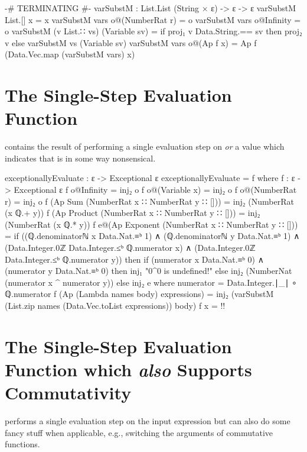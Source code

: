 \documentclass{report}
\begin{document}
\begin{code}
{-# TERMINATING #-}
varSubstM : List.List (String × ε) -> ε -> ε
varSubstM List.[] x = x
varSubstM vars o@(NumberRat r) = o
varSubstM vars o@Infinity = o
varSubstM (v List.∷ vs) (Variable sv) =
  if proj₁ v Data.String.== sv
     then proj₂ v
     else varSubstM vs (Variable sv)
varSubstM vars o@(Ap f x) = Ap f (Data.Vec.map (varSubstM vars) x)
\end{code}

\section{The Single-Step Evaluation Function}
  contains the result of performing a single evaluation step on  \emph{or} a value which indicates that  is in some way nonsensical.

\begin{code}
exceptionallyEvaluate : ε -> Exceptional ε
exceptionallyEvaluate = f
  where
  f : ε -> Exceptional ε
  f o@Infinity = inj₂ o
  f o@(Variable x) = inj₂ o
  f o@(NumberRat r) = inj₂ o
  f (Ap Sum (NumberRat x ∷ NumberRat y ∷ [])) =
    inj₂ (NumberRat (x ℚ.+ y))
  f (Ap Product (NumberRat x ∷ NumberRat y ∷ [])) =
    inj₂ (NumberRat (x ℚ.* y))
  f e@(Ap Exponent (NumberRat x ∷ NumberRat y ∷ [])) =
    if ((ℚ.denominatorℕ x Data.Nat.≡ᵇ 1) ∧
        (ℚ.denominatorℕ y Data.Nat.≡ᵇ 1) ∧
        (Data.Integer.0ℤ Data.Integer.≤ᵇ ℚ.numerator x) ∧
        (Data.Integer.0ℤ Data.Integer.≤ᵇ ℚ.numerator y))
       then if (numerator x Data.Nat.≡ᵇ 0) ∧
               (numerator y Data.Nat.≡ᵇ 0)
             then inj₁ "0^0 is undefined!"
             else inj₂ (NumberNat (numerator x ^ numerator y))
       else inj₂ e
       where numerator = Data.Integer.∣_∣ ∘ ℚ.numerator
  f (Ap (Lambda names body) expressions) =
    inj₂ (varSubstM (List.zip names (Data.Vec.toList expressions)) body)
  f x = {!!}
\end{code}

\section{The Single-Step Evaluation Function which \emph{also} Supports Commutativity}
  performs a single evaluation step on the input expression but can also do some fancy stuff when applicable, e.g., switching the arguments of commutative functions.
\end{document}
